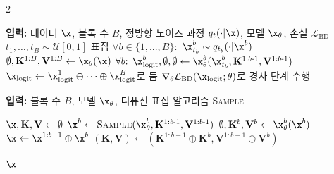 \begin{multicols}{2}
    \begin{algorithm}[H]
    \caption{블록 디퓨전 학습}
    \label{alg:sar-train}
    \begin{algorithmic}
    \State \textbf{입력:} 데이터 $\x$, 블록 수 $B$, 정방향 노이즈 과정 $q_t(\cdot|\x)$, 모델 $\x_\theta$, 손실 $\mathcal{L}_{\text{BD}}$
    \Repeat
        \State $t_1, \dots, t_B \sim \mathcal{U}[0, 1]$ 표집
        \State $\forall b \in \{1,...,B\}:$ $\x_{t_b}^b \sim q_{t_b}(\cdot|\x^b)$
        \State $\emptyset, \mathbf{K}^{1:B}, \mathbf{V}^{1:B} \gets \x_\theta(\x)$ 
        \State $\forall b \text{: } \x_\text{logit}^b, \emptyset, \emptyset \gets \x_\theta^b(\x_{t_b}^b,  \mathbf{K}^{1:b\text{-}1}, \mathbf{V}^{1:b\text{-}1})$
        \State $\x_\text{logit} \gets \x_\text{logit}^1 \oplus \dots \oplus \x^B_\text{logit}$로 둠
        \State $\nabla_\theta \mathcal{L}_{\text{BD}}(\x_{\text{logit}}; \theta)$로 경사 단계 수행

    \end{algorithmic}
    \end{algorithm}

    \columnbreak

    \begin{algorithm}[H]
    \caption{블록 디퓨전 표집}
    \label{alg:sar-inference}
    \begin{algorithmic}
    \State \textbf{입력:} 블록 수 $B$, 모델 $\x_\theta$, 디퓨전 표집 알고리즘 \textsc{Sample}
    \vspace{3pt}

    \State $\x, \mathbf{K},\mathbf{V} \gets \emptyset$ 
    \vspace{3pt}
        \State $\x^b \gets \textsc{Sample}(\x_\theta^b, \mathbf{K}^{1:b\text{-}1},\mathbf{V}^{1:b\text{-}1})$
        \State $\emptyset, \mathbf{K}^{b}, \mathbf{V}^{b} \gets \x_\theta^b(\x^b)$
        \State $\x \gets \x^{1:b-1} \oplus \x^b $
        \State $(\mathbf{K}, \mathbf{V}) \gets (\mathbf{K}^{1:b-1} \oplus \mathbf{K}^b, \mathbf{V}^{1:b-1} \oplus \mathbf{V}^b) $
    \EndFor

\State \Return $\x$
\end{algorithmic}
\end{algorithm}
\end{multicols}
    